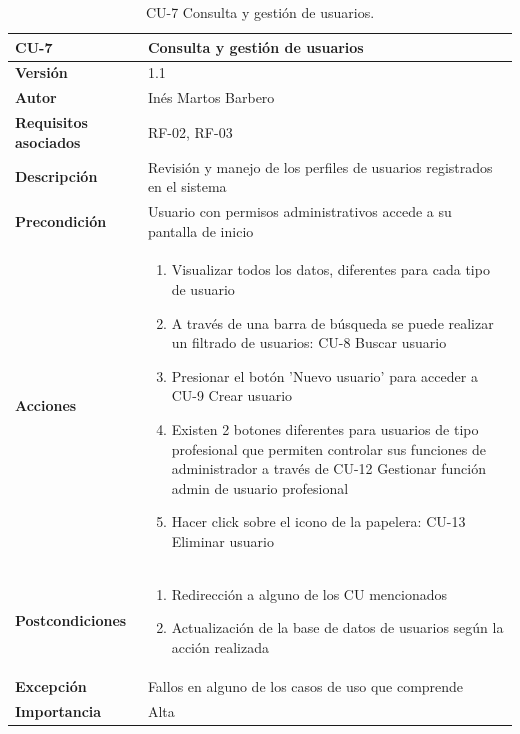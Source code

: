 \begin{table}[p]
	\centering
	\begin{tabularx}{\linewidth}{ p{} p{} }
		\toprule
		\textbf{CU-7}    & \textbf{Consulta y gestión de usuarios}\\
		\toprule
		\textbf{Versión}              & 1.1    \\
		\textbf{Autor}                & Inés Martos Barbero \\
		\textbf{Requisitos asociados} & RF-02, RF-03 \\
		\textbf{Descripción}          & Revisión y manejo de los perfiles de usuarios registrados en el sistema \\
		\textbf{Precondición}         & Usuario con permisos administrativos accede a su pantalla de inicio \\
		\textbf{Acciones}             &
		\begin{enumerate}
			\def\labelenumi{\arabic{enumi}.}
			\tightlist
			\item Visualizar todos los datos, diferentes para cada tipo de usuario
			\item A través de una barra de búsqueda se puede realizar un filtrado de usuarios: CU-8 Buscar usuario
            \item Presionar el botón 'Nuevo usuario' para acceder a CU-9 Crear usuario
            \item Existen 2 botones diferentes para usuarios de tipo profesional que permiten controlar sus funciones de administrador a través de CU-12 Gestionar función admin de usuario profesional
            \item Hacer click sobre el icono de la papelera: CU-13 Eliminar usuario
		\end{enumerate}\\
        \textbf{Postcondiciones}         & 
            \begin{enumerate}
			\def\labelenumi{\arabic{enumi}.}
			\tightlist
			\item Redirección a alguno de los CU mencionados
			\item Actualización de la base de datos de usuarios según la acción realizada
		\end{enumerate}\\
		\textbf{Excepción}          & Fallos en alguno de los casos de uso que comprende \\
		\textbf{Importancia}          & Alta \\
		\bottomrule
	\end{tabularx}
	\caption{CU-7 Consulta y gestión de usuarios.}
\end{table}


